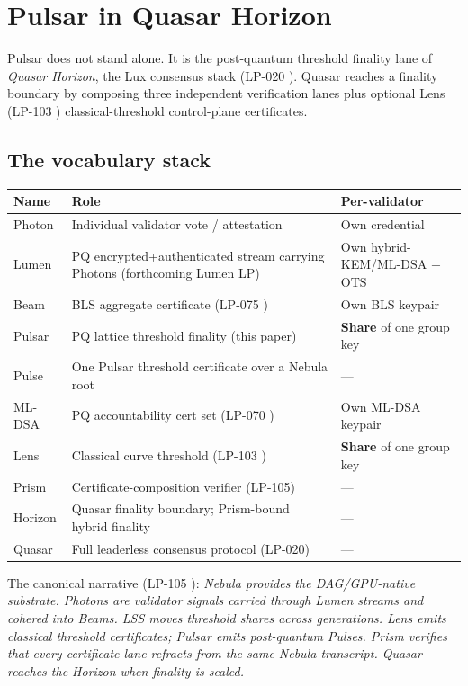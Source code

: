 \section{Pulsar in Quasar Horizon}
\label{sec:quasar}

Pulsar does not stand alone. It is the post-quantum threshold finality
lane of \emph{Quasar Horizon}, the Lux consensus stack
(LP-020 \cite{lp020}). Quasar reaches a finality boundary by composing
three independent verification lanes plus optional Lens (LP-103
\cite{lp103}) classical-threshold control-plane certificates.

\subsection{The vocabulary stack}

\begin{tabular}{@{}p{}p{}p{}@{}}
  \toprule
  \textbf{Name} & \textbf{Role} & \textbf{Per-validator} \\
  \midrule
  Photon  & Individual validator vote / attestation & Own credential \\
  Lumen   & PQ encrypted+authenticated stream carrying Photons (forthcoming Lumen LP) & Own hybrid-KEM/ML-DSA + OTS \\
  Beam    & BLS aggregate certificate (LP-075 \cite{lp075}) & Own BLS keypair \\
  Pulsar  & PQ lattice threshold finality (this paper) & \textbf{Share} of one group key \\
  Pulse   & One Pulsar threshold certificate over a Nebula root & --- \\
  ML-DSA  & PQ accountability cert set (LP-070 \cite{lp070}) & Own ML-DSA keypair \\
  Lens    & Classical curve threshold (LP-103 \cite{lp103}) & \textbf{Share} of one group key \\
  Prism   & Certificate-composition verifier (LP-105) & --- \\
  Horizon & Quasar finality boundary; Prism-bound hybrid finality & --- \\
  Quasar  & Full leaderless consensus protocol (LP-020) & --- \\
  \bottomrule
\end{tabular}

The canonical narrative (LP-105 \cite{lp105}): \emph{Nebula provides
the DAG/GPU-native substrate. Photons are validator signals carried
through Lumen streams and cohered into Beams. LSS moves threshold
shares across generations. Lens emits classical threshold certificates;
Pulsar emits post-quantum Pulses. Prism verifies that every certificate
lane refracts from the same Nebula transcript. Quasar reaches the
Horizon when finality is sealed.}

